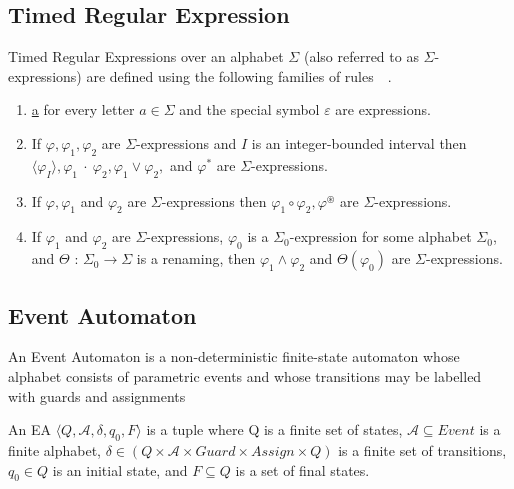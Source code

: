 		\subsection{Timed Regular Expression}
			\begin{dfn}
				Timed Regular Expressions over an alphabet $\Sigma$ (also referred to as $\Sigma$-expressions)
				are defined using the following families of rules~\citep{tre}~.
				\begin{enumerate}
					\item{\underline{a} for every letter $a \in \Sigma$ and the special symbol $\varepsilon$ are expressions.}
					\item{If $\varphi, \varphi_1, \varphi_2$ are $\Sigma$-expressions and $I$ is an integer-bounded interval then
						$\langle\varphi_I\rangle, \varphi_1~\cdot~\varphi_2, \varphi_1 \vee \varphi_2,$ and $\varphi^\ast$ are $\Sigma$-expressions.}
					\item{If $\varphi, \varphi_1$ and $\varphi_2$ are $\Sigma$-expressions then $\varphi_1 \circ \varphi_2, \varphi^\circledast$ are
						$\Sigma$-expressions.}
					\item{If $\varphi_1$ and $\varphi_2$ are $\Sigma$-expressions, $\varphi_0$ is a $\Sigma_0$-expression
						for some alphabet $\Sigma_0$, and $\Theta$ : $\Sigma_0 \rightarrow \Sigma$ is
						a renaming, then $\varphi_1 \wedge \varphi_2$ and $\Theta(\varphi_0)$ are $\Sigma$-expressions.}
				\end{enumerate}
			\end{dfn}
			
		
		\subsection{Event Automaton}
			An Event Automaton is a non-deterministic finite-state automaton whose alphabet consists
			of parametric events and whose transitions may be labelled with guards and assignments
			
			\begin{dfn}
				An EA
				$\langle Q,\mathcal{A},\delta, q_0, F \rangle$ is a tuple where Q is a finite set of states, 
				$\mathcal{A} \subseteq Event$ is a finite alphabet,
				$\delta \in (Q \times \mathcal{A} \times Guard \times Assign \times Q)$ is a finite set of transitions, 
				$q_0 \in Q$ is an initial state, and 
				$F \subseteq Q$ is a set of final states\citep{qea}.
			\end{dfn}
			
